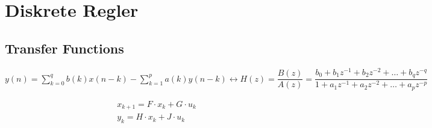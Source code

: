 
\section{Diskrete Regler}


\subsection{Transfer Functions}
$ y(n) = \sum\limits_{k=0}^{q} b(k)x(n-k) - \sum\limits_{k=1}^{p} a(k)y(n-k) \longleftrightarrow 
  H(z) = \dfrac{B(z)}{A(z)} = \dfrac{b_0 + b_1z^{-1} + b_2 z^{-2} + \dots +
      b_q z^{-q}}{1 + a_1z^{-1} + a_2 z^{-2} + \dots + a_p z^{-p}} $

\begin{eqnarray*}
x_{k+1}=F \cdot x_k + G \cdot u_k \\
y_k = H \cdot x_k + J \cdot u_k
\end{eqnarray*}      
